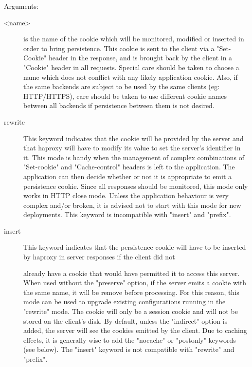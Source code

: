   
  Arguments:
  \begin{description}
  \item[<name>]    is the name of the cookie which will be monitored, modified or
              inserted in order to bring persistence. This cookie is sent to
              the client via a "Set-Cookie" header in the response, and is
              brought back by the client in a "Cookie" header in all requests.
              Special care should be taken to choose a name which does not
              conflict with any likely application cookie. Also, if the same
              backends are subject to be used by the same clients (eg:
              HTTP/HTTPS), care should be taken to use different cookie names
              between all backends if persistence between them is not desired.

  \item[rewrite]   This keyword indicates that the cookie will be provided by the
              server and that haproxy will have to modify its value to set the
              server's identifier in it. This mode is handy when the management
              of complex combinations of "Set-cookie" and "Cache-control"
              headers is left to the application. The application can then
              decide whether or not it is appropriate to emit a persistence
              cookie. Since all responses should be monitored, this mode only
              works in HTTP close mode. Unless the application behaviour is
              very complex and/or broken, it is advised not to start with this
              mode for new deployments. This keyword is incompatible with
              "insert" and "prefix".

  \item[insert]    This keyword indicates that the persistence cookie will have to
              be inserted by haproxy in server responses if the client did not

              already have a cookie that would have permitted it to access this
              server. When used without the "preserve" option, if the server
              emits a cookie with the same name, it will be remove before
              processing.  For this reason, this mode can be used to upgrade
              existing configurations running in the "rewrite" mode. The cookie
              will only be a session cookie and will not be stored on the
              client's disk. By default, unless the "indirect" option is added,
              the server will see the cookies emitted by the client. Due to
              caching effects, it is generally wise to add the "nocache" or
              "postonly" keywords (see below). The "insert" keyword is not
              compatible with "rewrite" and "prefix".


\end{description}
